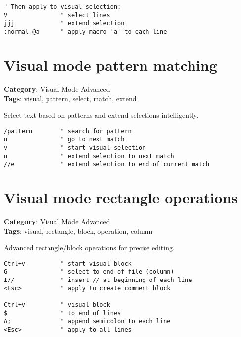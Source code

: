 {{{{{{{{{{{{{{{{{{\begin{Exa*}{}
\begin{Verbatim}[fontsize=\footnotesize, breaklines, breakanywhere]
" Then apply to visual selection:
V               " select lines
jjj             " extend selection
:normal @a      " apply macro 'a' to each line
\end{Verbatim}
\end{Exa*}

\section{Visual mode pattern matching}

\textbf{Category}: Visual Mode Advanced\\ \textbf{Tags}: visual, pattern, select, match, extend
\vspace{0.5cm}

Select text based on patterns and extend selections intelligently.

\begin{Exa*}{}
\begin{Verbatim}[fontsize=\footnotesize, breaklines, breakanywhere]
/pattern        " search for pattern
n               " go to next match
v               " start visual selection
n               " extend selection to next match
//e             " extend selection to end of current match
\end{Verbatim}
\end{Exa*}

\section{Visual mode rectangle operations}

\textbf{Category}: Visual Mode Advanced\\ \textbf{Tags}: visual, rectangle, block, operation, column
\vspace{0.5cm}

Advanced rectangle/block operations for precise editing.

\begin{Exa*}{}
\begin{Verbatim}[fontsize=\footnotesize, breaklines, breakanywhere]
Ctrl+v          " start visual block
G               " select to end of file (column)
I//             " insert // at beginning of each line
<Esc>           " apply to create comment block

Ctrl+v          " visual block
$               " to end of lines
A;              " append semicolon to each line
<Esc>           " apply to all lines
\end{Verbatim}
\end{Exa*}

}}}}}}}}}}}}}}}}}}
